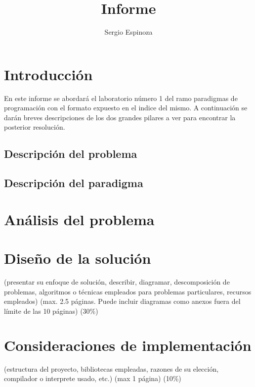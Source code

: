 \documentclass[10pt,letterpaper,openany]{article}
\title{Informe}
\author{Sergio Espinoza}
\begin{document}
    
    
    
    \tableofcontents
    \newpage


    
    \section{Introducción}
    En este informe se abordará el laboratorio número 1 del ramo paradigmas de programación
    con el formato expuesto en el indice del mismo. A continuación se darán breves descripciones
    de los dos grandes pilares a ver para encontrar la posterior resolución.  
        \subsection{Descripción del problema}
            
        \subsection{Descripción del paradigma}
            


    \section{Análisis del problema}
        

    \section{Diseño de la solución}
        
    (presentar su enfoque de solución, describir, diagramar, descomposición de problemas, algoritmos o técnicas empleados para problemas particulares, recursos empleados) (max. 2.5 páginas. Puede incluir diagramas como anexos fuera del límite de las 10 páginas) (30\%)

    \section{Consideraciones de implementación}
    (estructura del proyecto, bibliotecas empleadas, razones de su elección, compilador o interprete usado, etc.) (max 1 página) (10\%)
\end{document}
